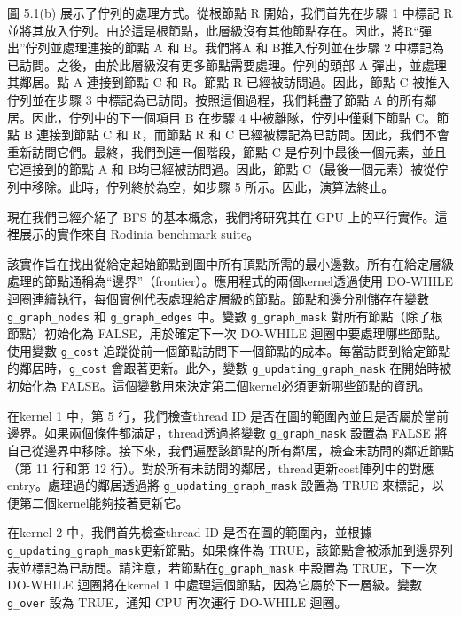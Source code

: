 \vspace{1em}
圖 5.1(b) 展示了佇列的處理方式。從根節點 R 開始，我們首先在步驟 1 中標記 R 並將其放入佇列。由於這是根節點，此層級沒有其他節點存在。因此，將R“彈出”佇列並處理連接的節點 A 和 B。我們將A 和 B推入佇列並在步驟 2 中標記為已訪問。之後，由於此層級沒有更多節點需要處理。佇列的頭部 A 彈出，並處理其鄰居。點 A 連接到節點 C 和 R。節點 R 已經被訪問過。因此，節點 C 被推入佇列並在步驟 3 中標記為已訪問。按照這個過程，我們耗盡了節點 A 的所有鄰居。因此，佇列中的下一個項目 B 在步驟 4 中被離隊，佇列中僅剩下節點 C。節點 B 連接到節點 C 和 R，而節點 R 和 C 已經被標記為已訪問。因此，我們不會重新訪問它們。最終，我們到達一個階段，節點 C 是佇列中最後一個元素，並且它連接到的節點 A 和 B均已經被訪問過。因此，節點 C（最後一個元素）被從佇列中移除。此時，佇列終於為空，如步驟 5 所示。因此，演算法終止。

\vspace{1em}
現在我們已經介紹了 BFS 的基本概念，我們將研究其在 GPU 上的平行實作。這裡展示的實作來自 Rodinia benchmark suite。

\vspace{1em}
該實作旨在找出從給定起始節點到圖中所有頂點所需的最小邊數。所有在給定層級處理的節點通稱為“邊界”（frontier）。應用程式的兩個kernel透過使用 DO-WHILE 迴圈連續執行，每個實例代表處理給定層級的節點。節點和邊分別儲存在變數 \texttt{g\_graph\_nodes} 和 \texttt{g\_graph\_edges} 中。變數 \texttt{g\_graph\_mask} 對所有節點（除了根節點）初始化為 FALSE，用於確定下一次 DO-WHILE 迴圈中要處理哪些節點。使用變數 \texttt{g\_cost} 追蹤從前一個節點訪問下一個節點的成本。每當訪問到給定節點的鄰居時，\texttt{g\_cost} 會跟著更新。此外，變數 \texttt{g\_updating\_graph\_mask} 在開始時被初始化為 FALSE。這個變數用來決定第二個kernel必須更新哪些節點的資訊。

\vspace{1em}
在kernel 1 中，第 5 行，我們檢查thread ID 是否在圖的範圍內並且是否屬於當前邊界。如果兩個條件都滿足，thread透過將變數 \texttt{g\_graph\_mask} 設置為 FALSE 將自己從邊界中移除。接下來，我們遍歷該節點的所有鄰居，檢查未訪問的鄰近節點（第 11 行和第 12 行）。對於所有未訪問的鄰居，thread更新cost陣列中的對應entry。處理過的鄰居透過將 \texttt{g\_updating\_graph\_mask} 設置為 TRUE 來標記，以便第二個kernel能夠接著更新它。

\vspace{1em}
在kernel 2 中，我們首先檢查thread ID 是否在圖的範圍內，並根據 \texttt{g\_updating\_graph\_mask}更新節點。如果條件為 TRUE，該節點會被添加到邊界列表並標記為已訪問。請注意，若節點在\texttt{g\_graph\_mask} 中設置為 TRUE，下一次 DO-WHILE 迴圈將在kernel 1 中處理這個節點，因為它屬於下一層級。變數 \texttt{g\_over} 設為 TRUE，通知 CPU 再次運行 DO-WHILE 迴圈。

